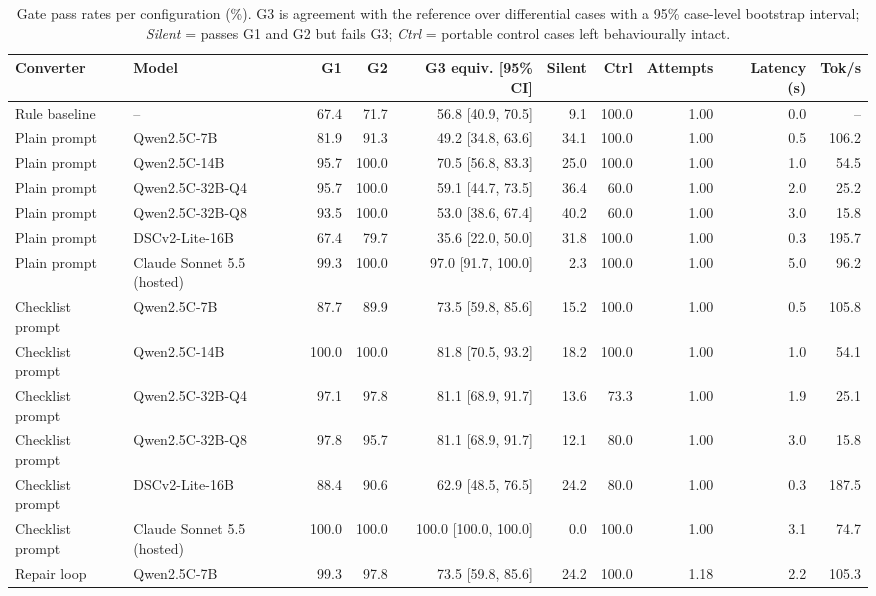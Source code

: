 \begin{table}[t]
\centering
\caption{Gate pass rates per configuration (\%). G3 is agreement with the reference over differential cases with a 95\% case-level bootstrap interval; \emph{Silent} = passes G1 and G2 but fails G3; \emph{Ctrl} = portable control cases left behaviourally intact.}
\label{tab:main}
\footnotesize
\setlength{\tabcolsep}{3.5pt}
\begin{tabular}{llrrrrrrrr}
\toprule
Converter & Model & G1 & G2 & G3 equiv. [95\% CI] & Silent & Ctrl & Attempts & Latency (s) & Tok/s \\
\midrule
Rule baseline & -- & 67.4 & 71.7 & 56.8 [40.9, 70.5] & 9.1 & 100.0 & 1.00 & 0.0 & -- \\
Plain prompt & Qwen2.5C-7B & 81.9 & 91.3 & 49.2 [34.8, 63.6] & 34.1 & 100.0 & 1.00 & 0.5 & 106.2 \\
Plain prompt & Qwen2.5C-14B & 95.7 & 100.0 & 70.5 [56.8, 83.3] & 25.0 & 100.0 & 1.00 & 1.0 & 54.5 \\
Plain prompt & Qwen2.5C-32B-Q4 & 95.7 & 100.0 & 59.1 [44.7, 73.5] & 36.4 & 60.0 & 1.00 & 2.0 & 25.2 \\
Plain prompt & Qwen2.5C-32B-Q8 & 93.5 & 100.0 & 53.0 [38.6, 67.4] & 40.2 & 60.0 & 1.00 & 3.0 & 15.8 \\
Plain prompt & DSCv2-Lite-16B & 67.4 & 79.7 & 35.6 [22.0, 50.0] & 31.8 & 100.0 & 1.00 & 0.3 & 195.7 \\
Plain prompt & Claude Sonnet 5.5 (hosted) & 99.3 & 100.0 & 97.0 [91.7, 100.0] & 2.3 & 100.0 & 1.00 & 5.0 & 96.2 \\
Checklist prompt & Qwen2.5C-7B & 87.7 & 89.9 & 73.5 [59.8, 85.6] & 15.2 & 100.0 & 1.00 & 0.5 & 105.8 \\
Checklist prompt & Qwen2.5C-14B & 100.0 & 100.0 & 81.8 [70.5, 93.2] & 18.2 & 100.0 & 1.00 & 1.0 & 54.1 \\
Checklist prompt & Qwen2.5C-32B-Q4 & 97.1 & 97.8 & 81.1 [68.9, 91.7] & 13.6 & 73.3 & 1.00 & 1.9 & 25.1 \\
Checklist prompt & Qwen2.5C-32B-Q8 & 97.8 & 95.7 & 81.1 [68.9, 91.7] & 12.1 & 80.0 & 1.00 & 3.0 & 15.8 \\
Checklist prompt & DSCv2-Lite-16B & 88.4 & 90.6 & 62.9 [48.5, 76.5] & 24.2 & 80.0 & 1.00 & 0.3 & 187.5 \\
Checklist prompt & Claude Sonnet 5.5 (hosted) & 100.0 & 100.0 & 100.0 [100.0, 100.0] & 0.0 & 100.0 & 1.00 & 3.1 & 74.7 \\
Repair loop & Qwen2.5C-7B & 99.3 & 97.8 & 73.5 [59.8, 85.6] & 24.2 & 100.0 & 1.18 & 2.2 & 105.3 \\

\end{tabular}
\end{table}
